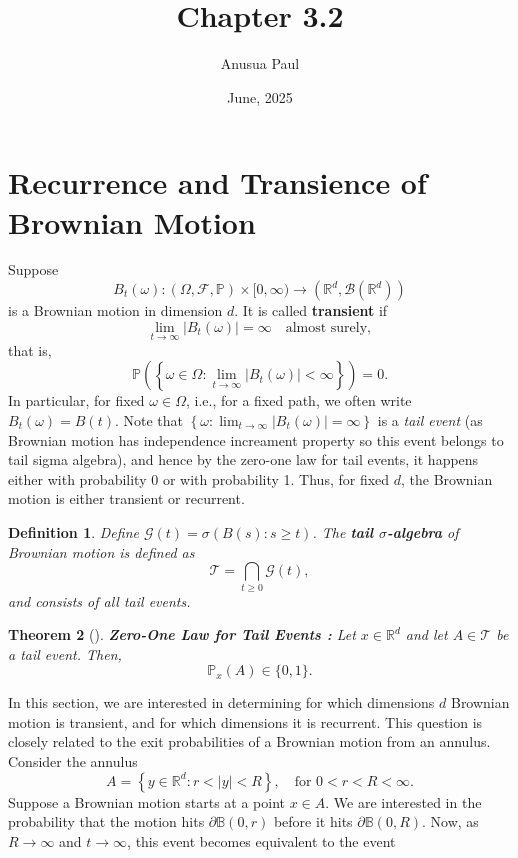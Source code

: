 \documentclass{article}
\title{Chapter 3.2}
\author{Anusua Paul}
\date{June, 2025}
\numberwithin{equation}{section}
\newtheorem{theorem}{Theorem}[section]
\newtheorem{definition}[theorem]{Definition}
\newcommand{\F}{\mathscr{F}}
\newcommand{\pp}{\mathbb{P}}
\begin{document}
\maketitle

\section{Recurrence and Transience of Brownian Motion}

Suppose 
\[
B_t(\omega) : (\Omega, \F, \pp) \times [0, \infty) \to (\mathbb{R}^d, \mathscr{B}(\mathbb{R}^d))
\]
is a Brownian motion in dimension \( d \). It is called \textbf{transient} if
\[
\lim_{t \to \infty} |B_t(\omega)| = \infty \quad \text{almost surely},
\]
that is,
\[
\pp\left( \left\{ \omega \in \Omega : \lim_{t \to \infty} |B_t(\omega)| < \infty \right\} \right) = 0.
\]
In particular, for fixed \( \omega \in \Omega \), i.e., for a fixed path, we often write \( B_t(\omega) = B(t) \).
Note that  \(
\left\{ \omega :\lim_{t \to \infty} |B_t(\omega)| = \infty \right\}
\) is a \textit{tail event} (as Brownian motion has independence increament property so this event belongs to tail sigma algebra), and hence by the zero-one law for tail events, it happens either with probability 0 or with probability 1. Thus, for fixed \( d \), the Brownian motion is either transient or recurrent.
\begin{definition}
Define \( \mathscr{G}(t) = \sigma(B(s) : s \geq t) \). The \textbf{tail \(\sigma\)-algebra} of Brownian motion  is defined as
\[
\mathscr{T} = \bigcap_{t \geq 0} \mathscr{G}(t),
\]
and consists of all tail events.
\end{definition}
\begin{theorem}[{\cite[Theorem 2.9]{PeresMortersBook}}]
\textbf{Zero-One Law for Tail Events : } Let \( x \in \mathbb{R}^d \) and let \( A \in \mathscr{T} \) be a tail event. Then,
\[
\mathbb{P}_x(A) \in \{0, 1\}.
\]
\end{theorem}
\noindent In this section, we are interested in determining for which dimensions \( d \) Brownian motion is transient, and for which dimensions it is recurrent. This question is closely related to the exit probabilities of a Brownian motion from an annulus.
Consider the annulus
\[
A = \left\{ y \in \mathbb{R}^d : r < |y| < R \right\}, \quad \text{for } 0 < r < R < \infty.
\]
Suppose a Brownian motion starts at a point \( x \in A \). We are interested in the probability that the motion hits \( \partial \mathbb{B}(0, r) \) before it hits \( \partial \mathbb{B}(0, R) \). 
Now, as \( R \to \infty \) and \( t \to \infty \), this event becomes equivalent to the event 
\end{document}
